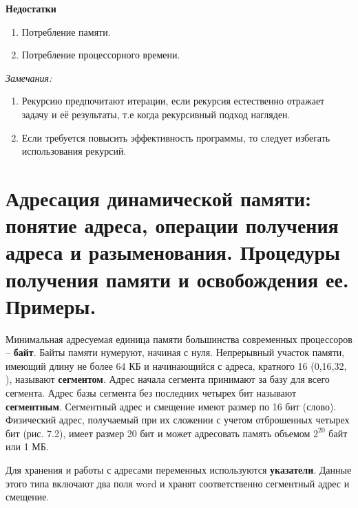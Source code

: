 {\bf Недостатки}
\begin{enumerate}
\item Потребление памяти. 
\item Потребление процессорного времени.
\end{enumerate}

{\textit {Замечания:}}
\begin{enumerate}
\item Рекурсию предпочитают итерации, если рекурсия естественно отражает задачу и её результаты, т.е когда рекурсивный подход нагляден.
\item Если требуется повысить эффективность программы, то следует избегать использования рекурсий.
\end{enumerate}








\newpage\section{Адресация динамической памяти: понятие адреса, операции получения адреса и разыменования. Процедуры получения памяти и освобождения ее. Примеры. }

\begin{myquote}
            
\end{myquote}

Минимальная адресуемая единица памяти большинства современных процессоров – {\bf байт}. Байты памяти нумеруют, начиная с нуля.
Непрерывный участок памяти, имеющий длину не более 64 КБ и начинающийся с адреса, кратного 16 (0,16,32, ), называют {\bf сегментом}. Адрес начала сегмента принимают за базу для всего сегмента. Адрес базы сегмента без последних четырех бит называют {\bf сегментным}. 
Сегментный адрес и смещение имеют размер по 16 бит (слово). Физический адрес, получаемый при их сложении с учетом отброшенных четырех 
бит (рис. 7.2), имеет размер 20 бит и может адресовать память объемом $2^{20}$ байт или 1 МБ.


Для хранения и работы с адресами переменных используются {\bf{указатели}}. Данные этого типа включают два поля word и хранят соответственно сегментный адрес и смещение.

